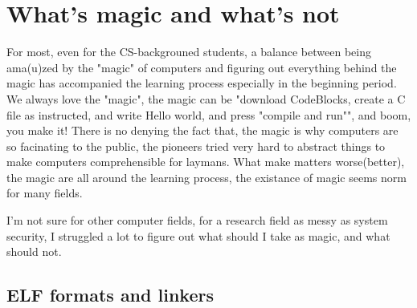 \section{What's magic and what's not}
For most, even for the CS-backgrouned students, a balance between being ama(u)zed by the "magic" of computers and figuring out everything behind the magic 
has accompanied the learning process especially in the beginning period.
We always love the "magic", the magic can be "download CodeBlocks, create a C file as instructed, and write Hello world, and press "compile and run"", and boom, you make it!
There is no denying the fact that, the magic is why computers are so facinating to the public, the pioneers tried very hard to abstract things to make computers comprehensible
for laymans. What make matters worse(better), the magic are all around the learning process, the existance of magic seems norm for many fields.

I'm not sure for other computer fields, for a research field as messy as system security, I struggled a lot to figure out what should I take as magic, and what should not.

\subsection{ELF formats and linkers}